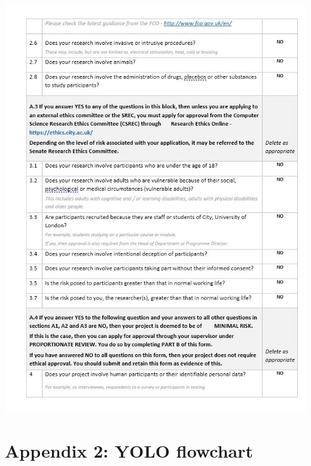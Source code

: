 \documentclass[12pt]{report}
\begin{document}
\includegraphics[width=160mm]{./images/appendix/PDD7.JPG}

\section*{Appendix 2: YOLO flowchart}
\end{document}
